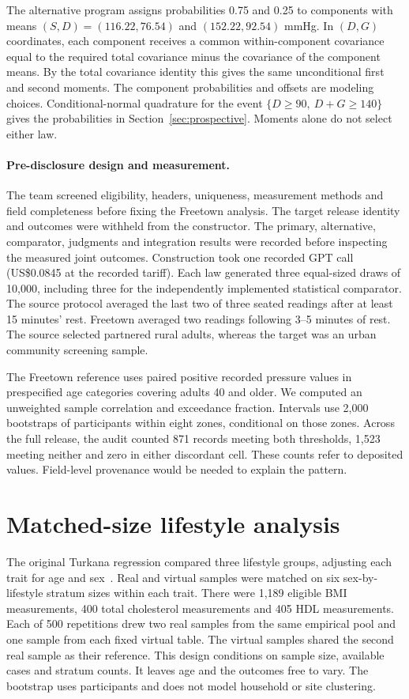 The alternative program assigns probabilities 0.75 and 0.25 to components with means $(S,D)=(116.22,76.54)$ and $(152.22,92.54)$ mmHg. In $(D,G)$ coordinates, each component receives a common within-component covariance equal to the required total covariance minus the covariance of the component means. By the total covariance identity this gives the same unconditional first and second moments. The component probabilities and offsets are modeling choices. Conditional-normal quadrature for the event $\{D\geq90,\ D+G\geq140\}$ gives the probabilities in Section~\ref{sec:prospective}. Moments alone do not select either law.

\paragraph{Pre-disclosure design and measurement.}
The team screened eligibility, headers, uniqueness, measurement methods and field completeness before fixing the Freetown analysis. The target release identity and outcomes were withheld from the constructor. The primary, alternative, comparator, judgments and integration results were recorded before inspecting the measured joint outcomes. Construction took one recorded GPT call (US\$0.0845 at the recorded tariff). Each law generated three equal-sized draws of 10,000, including three for the independently implemented statistical comparator. The source protocol averaged the last two of three seated readings after at least 15 minutes' rest. Freetown averaged two readings following 3--5 minutes of rest. The source selected partnered rural adults, whereas the target was an urban community screening sample.

The Freetown reference uses paired positive recorded pressure values in prespecified age categories covering adults 40 and older. We computed an unweighted sample correlation and exceedance fraction. Intervals use 2,000 bootstraps of participants within eight zones, conditional on those zones. Across the full release, the audit counted 871 records meeting both thresholds, 1,523 meeting neither and zero in either discordant cell. These counts refer to deposited values. Field-level provenance would be needed to explain the pattern.

\balance
\section{Matched-size lifestyle analysis}
\label{app:lifestyle}
The original Turkana regression compared three lifestyle groups, adjusting each trait for age and sex~\cite{lea}. Real and virtual samples were matched on six sex-by-lifestyle stratum sizes within each trait. There were 1,189 eligible BMI measurements, 400 total cholesterol measurements and 405 HDL measurements. Each of 500 repetitions drew two real samples from the same empirical pool and one sample from each fixed virtual table. The virtual samples shared the second real sample as their reference. This design conditions on sample size, available cases and stratum counts. It leaves age and the outcomes free to vary. The bootstrap uses participants and does not model household or site clustering.



